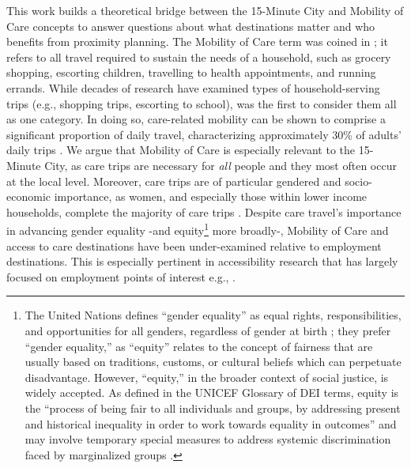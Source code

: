 \documentclass[
  authoryear,
  preprint,
  3p]{elsarticle}
\begin{document}
This work builds a theoretical bridge between the 15-Minute City and
Mobility of Care concepts to answer questions about what destinations
matter and who benefits from proximity planning. The Mobility of Care
term was coined in
\citet{sanchezdemadariagaMobilityCareIntroducing2013}; it refers to all
travel required to sustain the needs of a household, such as grocery
shopping, escorting children, travelling to health appointments, and
running errands. While decades of research have examined types of
household-serving trips (e.g., shopping trips, escorting to school),
\citet{sanchezdemadariagaMobilityCareIntroducing2013} was the first to
consider them all as one category. In doing so, care-related mobility
can be shown to comprise a significant proportion of daily travel,
characterizing approximately 30\% of adults' daily trips
\citep{sanchezdemadariagaMobilityCareIntroducing2013, sanchezdemadariagaMeasuringMobilitiesCare2019, ravensbergen2023exploratory}.
We argue that Mobility of Care is especially relevant to the 15-Minute
City, as care trips are necessary for \emph{all} people and they most
often occur at the local level. Moreover, care trips are of particular
gendered and socio-economic importance, as women, and especially those
within lower income households, complete the majority of care trips
\citep{ravensbergen2023exploratory}. Despite care travel's importance in
advancing gender equality -and equity\footnote{The United Nations
  defines ``gender equality'' as equal rights, responsibilities, and
  opportunities for all genders, regardless of gender at birth
  \citep{unwomenHandbookGenderMainstreaming2022}; they prefer ``gender
  equality,'' as ``equity'' relates to the concept of fairness that are
  usually based on traditions, customs, or cultural beliefs which can
  perpetuate disadvantage. However, ``equity,'' in the broader context
  of social justice, is widely accepted. As defined in the UNICEF
  Glossary of DEI terms, equity is the ``process of being fair to all
  individuals and groups, by addressing present and historical
  inequality in order to work towards equality in outcomes'' and may
  involve temporary special measures to address systemic discrimination
  faced by marginalized groups \citep{unicefAnnexDIVERSITYEQUITY2024}.}
more broadly-, Mobility of Care and access to care destinations have
been under-examined relative to employment destinations. This is
especially pertinent in accessibility research that has largely focused
on employment points of interest e.g.,
\citep{farberOntarioLineSocioeconomic2019, duarteInfluenceJobAccessibility2023, ryanAccessibilitySpaceTime2023}.
\end{document}
